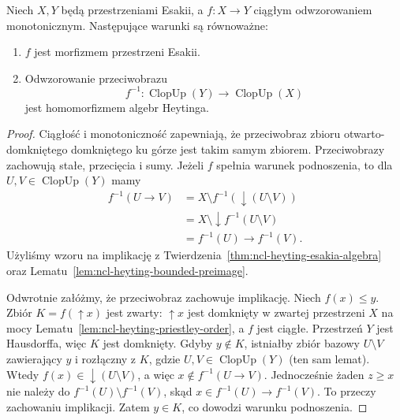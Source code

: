 \begin{twierdzenie}
\label{thm:ncl-heyting-esakia-morphism-characterization}
Niech $X,Y$ będą przestrzeniami Esakii, a $f:X\to Y$
ciągłym odwzorowaniem monotonicznym.
Następujące warunki są równoważne:
\begin{enumerate}
\item $f$ jest morfizmem przestrzeni Esakii.
\item Odwzorowanie przeciwobrazu
\[
 f^{-1}:\operatorname{ClopUp}(Y)
             \longrightarrow\operatorname{ClopUp}(X)
\]
jest homomorfizmem algebr Heytinga.
\end{enumerate}
\end{twierdzenie}
\begin{proof}
Ciągłość i monotoniczność zapewniają, że
przeciwobraz zbioru otwarto-domkniętego
domkniętego ku górze jest takim samym zbiorem.
Przeciwobrazy zachowują stałe, przecięcia i sumy.
Jeżeli $f$ spełnia warunek podnoszenia, to dla
$U,V\in\operatorname{ClopUp}(Y)$ mamy
\[
\begin{aligned}
 f^{-1}(U\to V)
 &=X\setminus f^{-1}(\downarrow(U\setminus V))\\
 &=X\setminus\downarrow f^{-1}(U\setminus V)\\
 &=f^{-1}(U)\to f^{-1}(V).
\end{aligned}
\]
Użyliśmy wzoru na implikację z
Twierdzenia~\ref{thm:ncl-heyting-esakia-algebra}
oraz Lematu~\ref{lem:ncl-heyting-bounded-preimage}.

Odwrotnie załóżmy, że przeciwobraz zachowuje
implikację. Niech $f(x)\leq y$.
Zbiór $K=f(\uparrow x)$ jest zwarty:
$\uparrow x$ jest domknięty w zwartej przestrzeni
$X$ na mocy
Lematu~\ref{lem:ncl-heyting-priestley-order},
a $f$ jest ciągłe. Przestrzeń $Y$ jest Hausdorffa,
więc $K$ jest domknięty.
Gdyby $y\notin K$, istniałby zbiór bazowy
$U\setminus V$ zawierający $y$ i rozłączny z $K$,
gdzie $U,V\in\operatorname{ClopUp}(Y)$
(ten sam lemat).
Wtedy $f(x)\in\downarrow(U\setminus V)$,
a więc $x\notin f^{-1}(U\to V)$.
Jednocześnie żaden $z\geq x$ nie należy do
$f^{-1}(U)\setminus f^{-1}(V)$, skąd
$x\in f^{-1}(U)\to f^{-1}(V)$.
To przeczy zachowaniu implikacji.
Zatem $y\in K$, co dowodzi warunku podnoszenia.
\end{proof}

